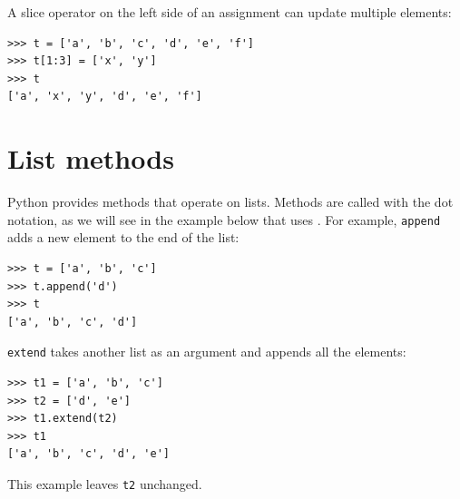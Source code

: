 A slice operator on the left side of an assignment can update multiple elements:

\begin{Verbatim}[frame=single]
>>> t = ['a', 'b', 'c', 'd', 'e', 'f']
>>> t[1:3] = ['x', 'y']
>>> t
['a', 'x', 'y', 'd', 'e', 'f']
\end{Verbatim}
%


%

%


\section{List methods}

Python provides methods that operate on lists. Methods are called with the dot notation, as we will see in the example below that uses . For example, \texttt{append} adds a new element to the end of the list: 

\begin{Verbatim}[frame=single]
>>> t = ['a', 'b', 'c']
>>> t.append('d')
>>> t
['a', 'b', 'c', 'd']
\end{Verbatim}



\texttt{extend} takes another list as an argument and appends all the elements:

\begin{Verbatim}[frame=single]
>>> t1 = ['a', 'b', 'c']
>>> t2 = ['d', 'e']
>>> t1.extend(t2)
>>> t1
['a', 'b', 'c', 'd', 'e']
\end{Verbatim}
%
This example leaves \texttt{t2} unchanged.

